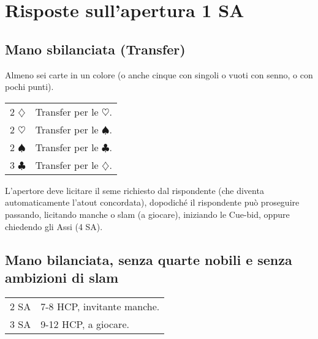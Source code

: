 \documentclass[a4paper,10pt]{article}
\renewcommand{\c}{$\clubsuit$\xspace}
\renewcommand{\d}{$\diamondsuit$\xspace}
\newcommand{\h}{$\heartsuit$\xspace}
\newcommand{\s}{$\spadesuit$\xspace}
\newcommand{\sa}{SA\xspace}
\newcommand{\smallspace}{\vskip0.3cm}
\newenvironment{twocol}
  {\smallspace\noindent\begin{tabular}{l p{0.78\textwidth}}}
  {\end{tabular}\smallspace}
\begin{document}
\pagebreak





\section{Risposte sull'apertura 1 SA}

\subsection{Mano sbilanciata (Transfer)}

Almeno sei carte in un colore (o anche cinque con singoli o vuoti con senno, o con pochi punti).

\begin{twocol}
 2 \d & Transfer per le \h.\\
 2 \h & Transfer per le \s.\\
 2 \s & Transfer per le \c.\\
 3 \c & Transfer per le \d.\\
\end{twocol}

L'apertore deve licitare il seme richiesto dal rispondente (che diventa automaticamente l'atout concordata), dopodiché il rispondente può proseguire passando, licitando manche o slam (a giocare), iniziando le Cue-bid, oppure chiedendo gli Assi (4 \sa).


\subsection{Mano bilanciata, senza quarte nobili e senza ambizioni di slam}

\begin{twocol}
 2 \sa & 7-8 HCP, invitante manche.\\
 3 \sa & 9-12 HCP, a giocare.
\end{twocol}
\end{document}

